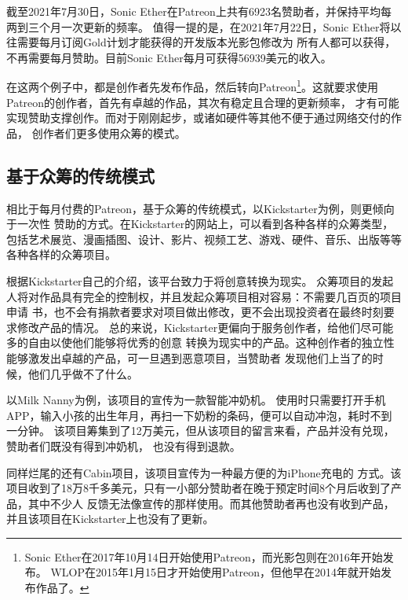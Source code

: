 \documentclass[11pt,UTF8,a4paper]{ctexart}
\begin{document}
    截至2021年7月30日，Sonic Ether在Patreon上共有6923名赞助者，并保持平均每两到三个月一次更新的频率。
    值得一提的是，在2021年7月22日，Sonic Ether将以往需要每月订阅Gold计划才能获得的开发版本光影包修改为
    所有人都可以获得，不再需要每月赞助。目前Sonic Ether每月可获得56939美元的收入。

    在这两个例子中，都是创作者先发布作品，然后转向Patreon\footnote{
        Sonic Ether在2017年10月14日开始使用Patreon，而光影包则在2016年开始发布。
        WLOP在2015年1月15日才开始使用Patreon，但他早在2014年就开始发布作品了。
    }。这就要求使用Patreon的创作者，首先有卓越的作品，其次有稳定且合理的更新频率，
    才有可能实现赞助支撑创作。而对于刚刚起步，或诸如硬件等其他不便于通过网络交付的作品，
    创作者们更多使用众筹的模式。

    \subsection{基于众筹的传统模式}\label{subsec:tradition_kickstarter}

    相比于每月付费的Patreon，基于众筹的传统模式，以Kickstarter为例，则更倾向于一次性
    赞助的方式。在Kickstarter的网站上，可以看到各种各样的众筹类型\cite{kickstarter_homepage}，
    包括艺术展览、漫画插图、设计、影片、视频工艺、游戏、硬件、音乐、出版等等各种各样的众筹项目。

    根据Kickstarter自己的介绍\cite{kickstarter_about}，该平台致力于将创意转换为现实。
    众筹项目的发起人将对作品具有完全的控制权，并且发起众筹项目相对容易：不需要几百页的项目申请
    书，也不会有捐款者要求对项目做出修改，更不会出现投资者在最终时刻要求修改产品的情况。
    总的来说，Kickstarter更偏向于服务创作者，给他们尽可能多的自由以使他们能够将优秀的创意
    转换为现实中的产品。这种创作者的独立性能够激发出卓越的产品，可一旦遇到恶意项目，当赞助者
    发现他们上当了的时候，他们几乎做不了什么。

    以Milk Nanny为例\cite{kickstarter_milk_nanny}，该项目的宣传为一款智能冲奶机。
    使用时只需要打开手机APP，输入小孩的出生年月，再扫一下奶粉的条码，便可以自动冲泡，耗时不到一分钟。
    该项目筹集到了12万美元，但从该项目的留言来看，产品并没有兑现，赞助者们既没有得到冲奶机，
    也没有得到退款。

    同样烂尾的还有Cabin项目\cite{kickstarter_cabin}，该项目宣传为一种最方便的为iPhone充电的
    方式。该项目收到了18万8千多美元，只有一小部分赞助者在晚于预定时间8个月后收到了产品，其中不少人
    反馈无法像宣传的那样使用。而其他赞助者再也没有收到产品，并且该项目在Kickstarter上也没有了更新。
\end{document}
